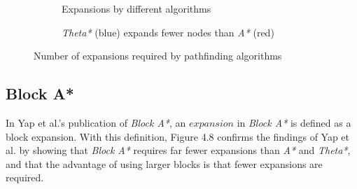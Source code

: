 \documentclass[12pt,notitlepage]{report}
\begin{document}
\begin{figure}
\centering
  \begin{subfigure}[b]{0.49\textwidth}
  \centering
  
  \caption{Expansions by different algorithms}
  \end{subfigure}
  \begin{subfigure}[b]{0.49\textwidth}
  \centering
  \caption{{\em Theta*} (blue) expands fewer nodes than {\em A*} (red)}
  \end{subfigure}
\caption{Number of expansions required by pathfinding algorithms}
\end{figure}

\subsection{Block A*}
In Yap et al.'s publication of {\em Block A*}, an $expansion$ in {\em Block A*} is defined as a block expansion. With this definition,  Figure 4.8 confirms the findings of Yap et al. by showing that {\em Block A*} requires far fewer expansions than {\em A*} and {\em Theta*}, and that the advantage of using larger blocks is that fewer expansions are required.\\
\end{document}
